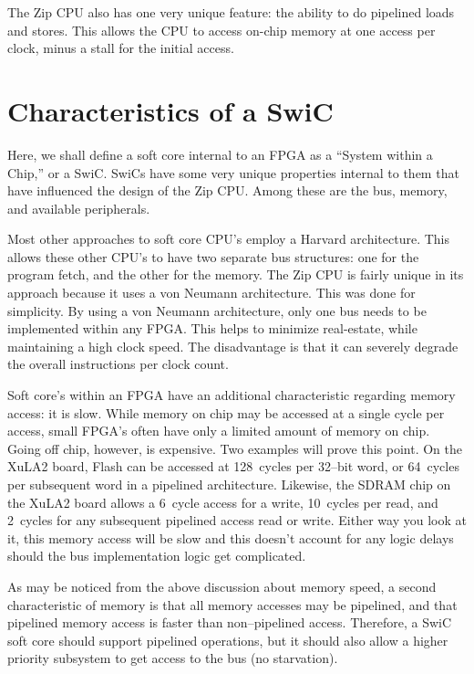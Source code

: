 \documentclass{gqtekspec}
\begin{document}
The Zip CPU also has one very unique feature: the ability to do pipelined loads
and stores.  This allows the CPU to access on-chip memory at one access per
clock, minus a stall for the initial access.

\section{Characteristics of a SwiC}

Here, we shall define a soft core internal to an FPGA as a ``System within a
Chip,'' or a SwiC.  SwiCs have some very unique properties internal to them
that have influenced the design of the Zip CPU.  Among these are the bus,
memory, and available peripherals.

Most other approaches to soft core CPU's employ a Harvard architecture. 
This allows these other CPU's to have two separate bus structures: one for the
program fetch, and the other for the memory.  The Zip CPU is fairly unique in
its approach because it uses a von Neumann architecture.  This was done for
simplicity.  By using a von Neumann architecture, only one bus needs to be
implemented within any FPGA.  This helps to minimize real-estate, while
maintaining a high clock speed.  The disadvantage is that it can severely
degrade the overall instructions per clock count.

Soft core's within an FPGA have an additional characteristic regarding
memory access: it is slow.  While memory on chip may be accessed at a single
cycle per access, small FPGA's often have only a limited amount of memory on
chip.  Going off chip, however, is expensive.  Two examples will prove this
point.  On
the XuLA2 board, Flash can be accessed at 128~cycles per 32--bit word,
or 64~cycles per subsequent word in a pipelined architecture.  Likewise, the
SDRAM chip on the XuLA2 board allows a 6~cycle access for a write, 10~cycles
per read, and 2~cycles for any subsequent pipelined access read or write.
Either way you look at it, this memory access will be slow and this doesn't
account for any logic delays should the bus implementation logic get
complicated.

As may be noticed from the above discussion about memory speed, a second
characteristic of memory is that all memory accesses may be pipelined, and
that pipelined memory access is faster than non--pipelined access.  Therefore,
a SwiC soft core should support pipelined operations, but it should also
allow a higher priority subsystem to get access to the bus (no starvation).
\end{document}
